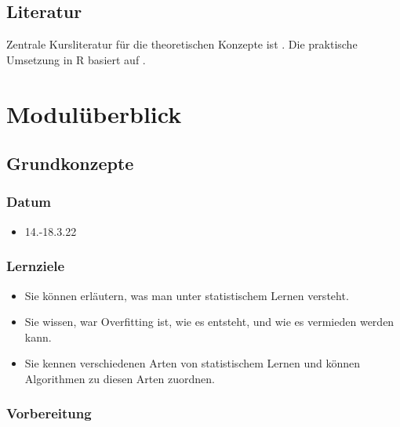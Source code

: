 \documentclass[
]{book}
\providecommand{\tightlist}{%
  \setlength{\itemsep}{0pt}\setlength{\parskip}{0pt}}
\begin{document}
\hypertarget{literatur}{%
\section{Literatur}\label{literatur}}

Zentrale Kursliteratur für die theoretischen Konzepte ist \citep{rhys_machine_2020}.
Die praktische Umsetzung in R basiert auf \citep{silge_tidy_2022}.

\hypertarget{moduluxfcberblick}{%
\chapter{Modulüberblick}\label{moduluxfcberblick}}

\hypertarget{grundkonzepte}{%
\section{Grundkonzepte}\label{grundkonzepte}}

\hypertarget{datum}{%
\subsection{Datum}\label{datum}}

\begin{itemize}
\tightlist
\item
  14.-18.3.22
\end{itemize}

\hypertarget{lernziele-1}{%
\subsection{Lernziele}\label{lernziele-1}}

\begin{itemize}
\tightlist
\item
  Sie können erläutern, was man unter statistischem Lernen versteht.
\item
  Sie wissen, war Overfitting ist, wie es entsteht, und wie es vermieden werden kann.
\item
  Sie kennen verschiedenen Arten von statistischem Lernen und können Algorithmen zu diesen Arten zuordnen.
\end{itemize}

\hypertarget{vorbereitung}{%
\subsection{Vorbereitung}\label{vorbereitung}}
\end{document}
